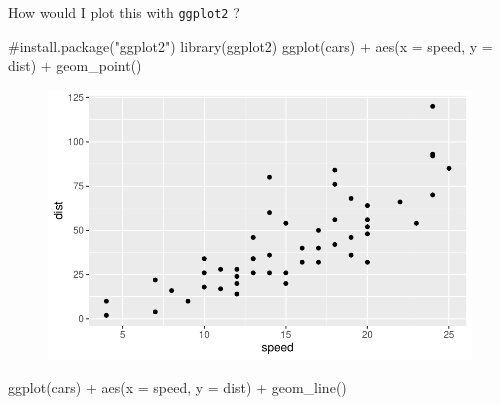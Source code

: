 \documentclass[
  letterpaper,
  DIV=11,
  numbers=noendperiod]{scrartcl}
\newenvironment{Shaded}{\begin{snugshade}}{\end{snugshade}}
\newcommand{\AttributeTok}[1]{\textcolor[rgb]{0.40,0.45,0.13}{#1}}
\newcommand{\CommentTok}[1]{\textcolor[rgb]{0.37,0.37,0.37}{#1}}
\newcommand{\FunctionTok}[1]{\textcolor[rgb]{0.28,0.35,0.67}{#1}}
\newcommand{\NormalTok}[1]{\textcolor[rgb]{0.00,0.23,0.31}{#1}}
\newcommand{\SpecialCharTok}[1]{\textcolor[rgb]{0.37,0.37,0.37}{#1}}
\begin{document}
How would I plot this with \texttt{ggplot2} ?

\begin{Shaded}
\begin{Highlighting}[]
\CommentTok{\#install.package("ggplot2")}
\FunctionTok{library}\NormalTok{(ggplot2)}
\FunctionTok{ggplot}\NormalTok{(cars) }\SpecialCharTok{+} \FunctionTok{aes}\NormalTok{(}\AttributeTok{x =}\NormalTok{ speed, }\AttributeTok{y =}\NormalTok{ dist) }\SpecialCharTok{+} \FunctionTok{geom\_point}\NormalTok{()}
\end{Highlighting}
\end{Shaded}

\begin{figure}[H]

{\centering \includegraphics{class05_files/figure-pdf/unnamed-chunk-2-1.pdf}

}

\end{figure}

\begin{Shaded}
\begin{Highlighting}[]
\FunctionTok{ggplot}\NormalTok{(cars) }\SpecialCharTok{+} \FunctionTok{aes}\NormalTok{(}\AttributeTok{x =}\NormalTok{ speed, }\AttributeTok{y =}\NormalTok{ dist) }\SpecialCharTok{+} \FunctionTok{geom\_line}\NormalTok{()}
\end{Highlighting}
\end{Shaded}
\end{document}
